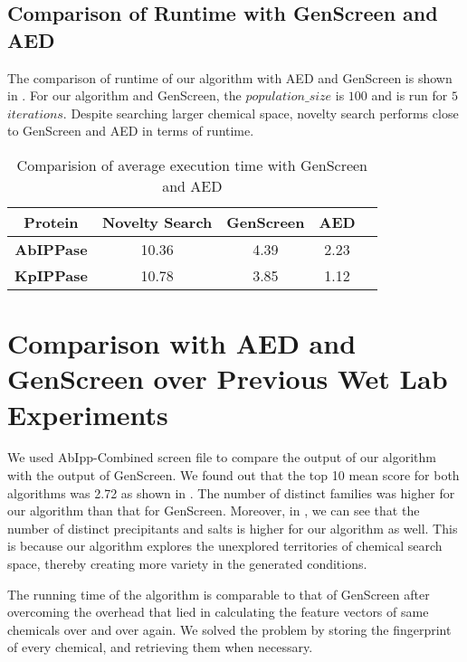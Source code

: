 \subsection{Comparison of Runtime with GenScreen and AED} \label{sec:results-runtime-summary}

The comparison of runtime of our algorithm with AED and GenScreen is shown in . For our algorithm and GenScreen, the $population\_size$ is $100$ and is run for $5$ $iterations$. Despite searching larger chemical space, novelty search performs close to GenScreen and AED in terms of runtime.

\begin{table}[htbp]
\begin{center}
\caption{Comparision of average execution time with GenScreen and AED}
\begin{tabular}{|c|c|c|c|c|}
\hline
\textbf{Protein} & \textbf{Novelty Search} & \textbf{GenScreen} & \textbf{AED} \\
\hline
\textbf{AbIPPase} & 10.36 & 4.39 & 2.23  \\
\hline
\textbf{KpIPPase} & 10.78 & 3.85 & 1.12  \\
\hline
\end{tabular}
\label{runtime_comparision_table}
\end{center}
\end{table}

\section{Comparison with AED and GenScreen  over Previous Wet Lab Experiments} \label{sec:results-comparison}

We used AbIpp-Combined screen file to compare the output of our algorithm with the output of GenScreen. We found out that the top 10 mean score for both algorithms was 2.72 as shown in . The number of distinct families was higher for our algorithm than that for GenScreen. Moreover, in , we can see that the number of distinct precipitants and salts is higher for our algorithm as well. This is because our algorithm explores the unexplored territories of chemical search space, thereby creating more variety in the generated conditions.

The running time of the algorithm is comparable to that of GenScreen after overcoming the overhead that lied in calculating the feature vectors of same chemicals over and over again. We solved the problem by storing the fingerprint of every chemical, and retrieving them when necessary.

